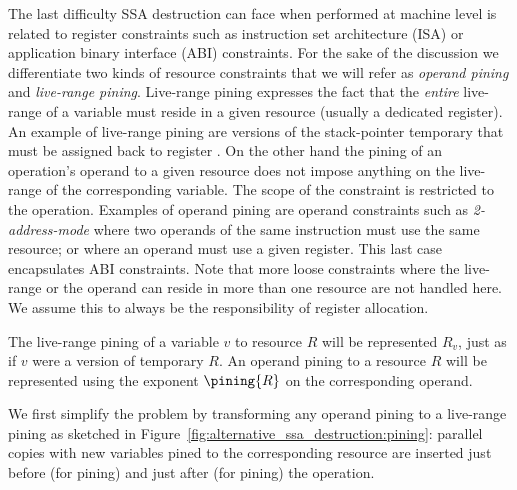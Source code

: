 The last difficulty SSA destruction can face when performed at machine level is related to register constraints such as instruction set architecture (ISA) or application binary interface (ABI) constraints. For the sake of the discussion we differentiate two kinds of resource constraints that we will refer as \emph{operand pining} and \emph{live-range pining}. Live-range pining expresses the fact that the \emph{entire} live-range of a variable must reside in a given resource (usually a dedicated register). An example of live-range pining are versions of the stack-pointer temporary that must be assigned back to register \SP. On the other hand the pining of an operation's operand to a given resource does not impose anything on the live-range of the corresponding variable. The scope of the constraint is restricted to the operation. Examples of operand pining are operand constraints such as \emph{2-address-mode} where two operands of the same instruction must use the same resource; or where an operand must use a given register. This last case encapsulates ABI constraints. 
Note that more loose constraints where the live-range or the operand can reside in more than one resource are not handled here. We assume this to always be the responsibility of register allocation.

The live-range pining of a variable $v$ to resource $R$ will be represented $R_v$, just as if $v$ were a version of temporary $R$. An operand pining to a resource $R$ will be represented using the exponent $\pining{R}$ on the corresponding operand. 

We first simplify the problem by transforming any operand pining to a live-range pining as sketched in Figure~\ref{fig:alternative_ssa_destruction:pining}: parallel copies with new variables pined to the corresponding resource are inserted just before (for \useop pining) and just after (for  pining) the operation.

